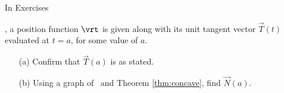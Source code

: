 {\noindent In Exercises}
{ , a position function $\vrt$ is given along with its unit tangent vector $\vec T(t)$ evaluated at $t=a$, for some value of $a$.
\begin{enumerate}
	\item [(a)] Confirm that $\vec T(a)$ is as stated.
	\item	[(b)] Using a graph of \vrt\ and Theorem \ref{thm:concave}, find $\vec N(a)$.
\end{enumerate}
}

